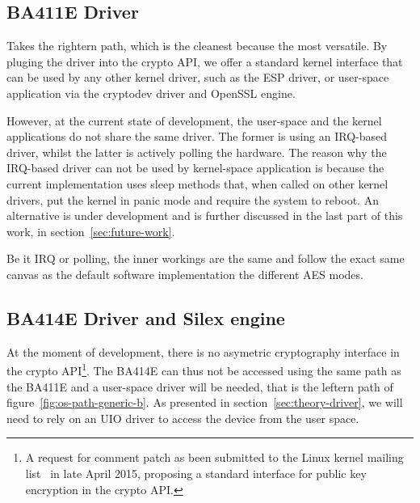 \subsection{BA411E Driver}
Takes the rightern path, which is the cleanest because the most versatile.
By pluging the driver into the crypto API, we offer a standard kernel interface that can be used by any other kernel driver, such as the ESP driver, or user-space application via the cryptodev driver and OpenSSL engine.

However, at the current state of development, the user-space and the kernel applications do not share the same driver.
The former is using an IRQ-based driver, whilst the latter is actively polling the hardware.
The reason why the IRQ-based driver can not be used by kernel-space application is because the current implementation uses sleep methods that, when called on other kernel drivers, put the kernel in panic mode and require the system to reboot.
An alternative is under development and is further discussed in the last part of this work, in section~\ref{sec:future-work}.

Be it IRQ or polling, the inner workings are the same and follow the exact same canvas as the default software implementation the different AES modes.


\subsection{BA414E Driver and Silex engine}
At the moment of development, there is no asymetric cryptography interface in the crypto API\footnote{A request for comment patch as been submitted to the Linux kernel mailing list~\cite{crypto-api-pk-encryption} in late April 2015, proposing a standard interface for public key encryption in the crypto API.}.
The BA414E can thus not be accessed using the same path as the BA411E and a user-space driver will be needed, that is the leftern path of figure~\ref{fig:os-path-generic-b}.
As presented in section~\ref{sec:theory-driver}, we will need to rely on an UIO driver to access the device from the user space.